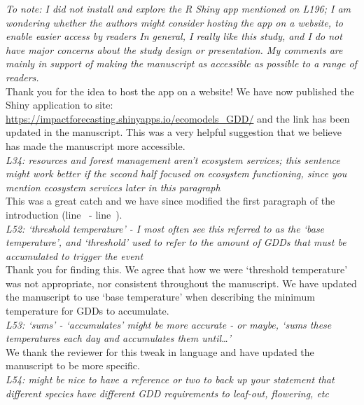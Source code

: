\documentclass[11pt,a4paper]{article}\usepackage[]{graphicx}\usepackage[]{color}
\newcommand{\lr}[1]{line~\lineref{#1}}
\begin{document}
\textit{To note: I did not install and explore the R Shiny app mentioned on L196; I am wondering whether the authors might consider hosting the app on a website, to enable easier access by readers
In general, I really like this study, and I do not have major concerns about the study design or presentation. My comments are mainly in support of making the manuscript as accessible as possible to a range of readers.} \\

Thank you for the idea to host the app on a website! We have now published the Shiny application to site: \url{https://impactforecasting.shinyapps.io/ecomodels_GDD/} and the link has been updated in the manuscript. This was a very helpful suggestion that we believe has made the manuscript more accessible. \\ 

\textit{L34: resources and forest management aren't ecosystem services; this sentence might work better if the second half focused on ecosystem functioning, since you mention ecosystem services later in this paragraph} \\

This was a great catch and we have since modified the first paragraph of the introduction (\lr{Z3ecosys} - \lr{Z3ecosysend}). \\

\textit{L52: `threshold temperature' - I most often see this referred to as the `base temperature', and `threshold' used to refer to the amount of GDDs that must be accumulated to trigger the event} \\

Thank you for finding this. We agree that how we were `threshold temperature' was not appropriate, nor consistent throughout the manuscript. We have updated the manuscript to use `base temperature' when describing the minimum temperature for GDDs to accumulate. \\

\textit{L53: `sums' - `accumulates' might be more accurate - or maybe, `sums these temperatures each day and accumulates them until…'} \\

We thank the reviewer for this tweak in language and have updated the manuscript to be more specific.\\

\textit{L54: might be nice to have a reference or two to back up your statement that different species have different GDD requirements to leaf-out, flowering, etc} \\
\end{document}
